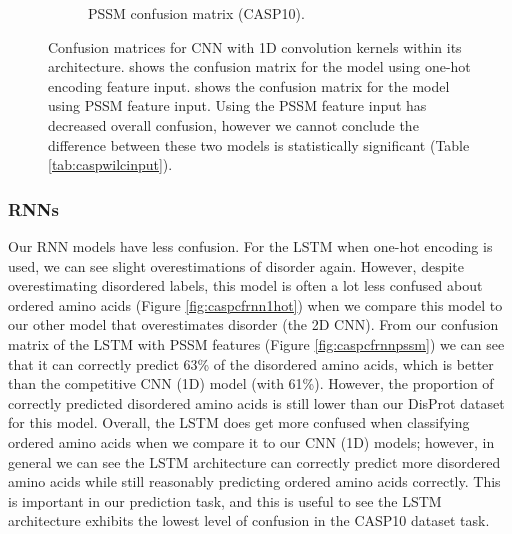 \documentclass{l4proj}
\begin{document}
\begin{figure}[!htb]
\begin{subfigure}[b]{0.48\textwidth}
        \caption{PSSM confusion matrix (CASP10).}
        \label{fig:caspcf1dpssm}
    \end{subfigure}
    \caption{Confusion matrices for CNN with 1D convolution kernels within its architecture.  shows the confusion matrix for the model using one-hot encoding feature input.  shows the confusion matrix for the model using PSSM feature input. Using the PSSM feature input has decreased overall confusion, however we cannot conclude the difference between these two models is statistically significant (Table \ref{tab:caspwilcinput}).}
    \label{fig:caspcf1d}
\end{figure}

\subsubsection{RNNs \newline}

Our RNN models have less confusion. For the LSTM when one-hot encoding is used, we can see slight overestimations of disorder again. However, despite overestimating disordered labels, this model is often a lot less confused about ordered amino acids (Figure \ref{fig:caspcfrnn1hot}) when we compare this model to our other model that overestimates disorder (the 2D CNN). From our confusion matrix of the LSTM with PSSM features (Figure \ref {fig:caspcfrnnpssm}) we can see that it can correctly predict 63\% of the disordered amino acids, which is better than the competitive CNN (1D) model (with 61\%). However, the proportion of correctly predicted disordered amino acids is still lower than our DisProt dataset for this model. Overall, the LSTM does get more confused when classifying ordered amino acids when we compare it to our CNN (1D) models; however, in general we can see the LSTM architecture can correctly predict more disordered amino acids while still reasonably predicting ordered amino acids correctly. This is important in our prediction task, and this is useful to see the LSTM architecture exhibits the lowest level of confusion in the CASP10 dataset task.
\end{document}
